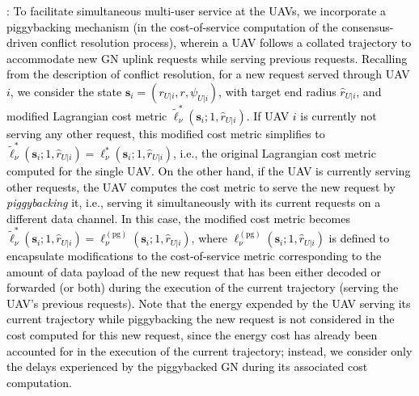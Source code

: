 \documentclass[12pt, draftcls, onecolumn]{IEEEtran}
\theoremstyle{plain}
\theoremstyle{definition}
\theoremstyle{remark}
\newcommand\hlt[1]{\textcolor{black}{#1}}
\begin{document}
\label{pb_label}
\noindent{\hlt{\textbf{Piggybacking}}}: \hlt{To facilitate simultaneous multi-user service at the UAVs, we incorporate a piggybacking mechanism (in the cost-of-service computation of the consensus-driven conflict resolution process), wherein a UAV follows a collated trajectory to accommodate new GN uplink requests while serving previous requests. Recalling from the description of conflict resolution, for a new request served through UAV $i$, we consider the state $\mathbf s_i = \left( r_{U|i}, r, \psi_{U|i} \right)$, with target end radius $\hat r_{U|i}$, and modified Lagrangian cost metric $\tilde{\ell}_{\nu}^{*} (\mathbf s_i; 1, \hat r_{U|i} )$. If UAV $i$ is currently not serving any other request, this modified cost metric simplifies to $\tilde{\ell}_{\nu}^* (\mathbf s_i; 1, \hat r_{U|i}) {=} \ell_{\nu}^* (\mathbf s_i; 1, \hat r_{U|i})$, i.e., the original Lagrangian cost metric computed for the single UAV. On the other hand, if the UAV is currently serving other requests, the UAV computes the cost metric to serve the new request by \emph{piggybacking} it, i.e., serving it simultaneously with its current requests on a different data channel. In this case, the modified cost metric becomes $\tilde{\ell}_{\nu}^* (\mathbf s_i ; 1, \hat r_{U|i} ) {=} \ell_{\nu}^{(\mathrm{pg})} (\mathbf s_i; 1, \hat r_{U|i})$, where $\ell_{\nu}^{(\mathrm{pg})} (\mathbf s_i; 1, \hat r_{U|i})$ is defined to encapsulate modifications to the cost-of-service metric corresponding to the amount of data payload of the new request that has been either decoded or forwarded (or both) during the execution of the current trajectory (serving the UAV's previous requests). Note that the energy expended by the UAV serving its current trajectory while piggybacking the new request is not considered in the cost computed for this new request, since the energy cost has already been accounted for in the execution of the current trajectory; instead, we consider only the delays experienced by the piggybacked GN during its associated cost computation.}
\vspace{-4mm}
\end{document}
